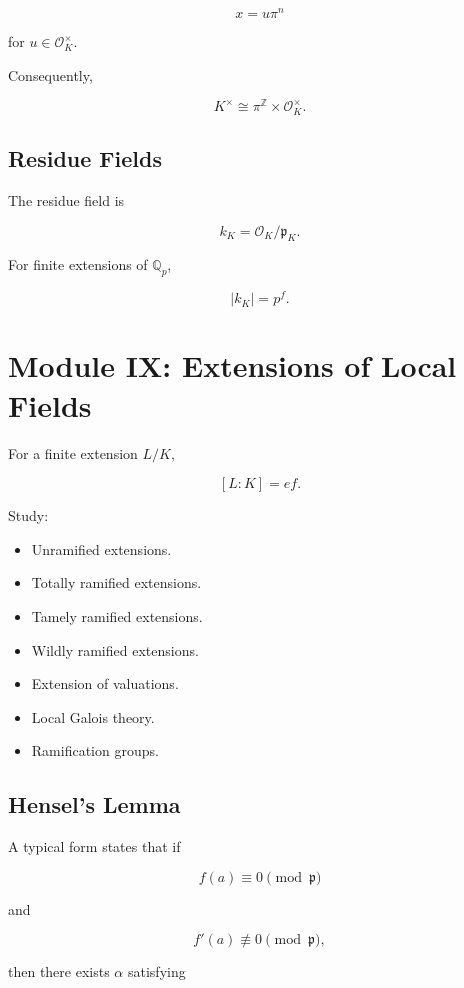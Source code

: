 \documentclass[11pt]{article}
\begin{document}
\[
x=u\pi^n
\]

for $u\in\mathcal{O}_K^\times$.

Consequently,

\[
K^\times
\cong
\pi^{\mathbb{Z}}
\times
\mathcal{O}_K^\times.
\]

\subsection{Residue Fields}

The residue field is

\[
k_K
=
\mathcal{O}_K/\mathfrak{p}_K.
\]

For finite extensions of $\mathbb{Q}_p$,

\[
|k_K|=p^f.
\]

\section{Module IX: Extensions of Local Fields}

For a finite extension $L/K$,

\[
[L:K]=ef.
\]

Study:

\begin{itemize}
    \item Unramified extensions.
    \item Totally ramified extensions.
    \item Tamely ramified extensions.
    \item Wildly ramified extensions.
    \item Extension of valuations.
    \item Local Galois theory.
    \item Ramification groups.
\end{itemize}

\subsection{Hensel's Lemma}

A typical form states that if

\[
f(a)\equiv0\pmod{\mathfrak{p}}
\]

and

\[
f'(a)\not\equiv0\pmod{\mathfrak{p}},
\]

then there exists $\alpha$ satisfying
\end{document}
